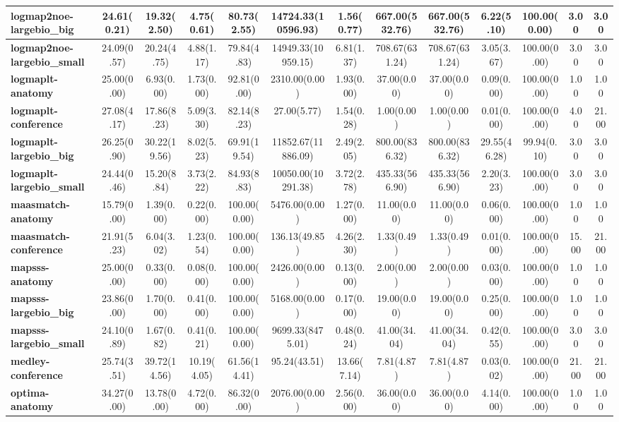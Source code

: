 \begin{tabular}{|l|c|c|c|c|c|c|c|c|c|c|c|c|}
\textbf{logmap2noe-largebio\_big}&24.61(0.21)&19.32(2.50)&4.75(0.61)&80.73(2.55)&14724.33(10596.93)&1.56(0.77)&667.00(532.76)&667.00(532.76)&6.22(5.10)&100.00(0.00)&3.00&3.00\\\hline
\textbf{logmap2noe-largebio\_small}&24.09(0.57)&20.24(4.75)&4.88(1.17)&79.84(4.83)&14949.33(10959.15)&6.81(1.37)&708.67(631.24)&708.67(631.24)&3.05(3.67)&100.00(0.00)&3.00&3.00\\\hline
\textbf{logmaplt-anatomy}&25.00(0.00)&6.93(0.00)&1.73(0.00)&92.81(0.00)&2310.00(0.00)&1.93(0.00)&37.00(0.00)&37.00(0.00)&0.09(0.00)&100.00(0.00)&1.00&1.00\\\hline
\textbf{logmaplt-conference}&27.08(4.17)&17.86(8.23)&5.09(3.30)&82.14(8.23)&27.00(5.77)&1.54(0.28)&1.00(0.00)&1.00(0.00)&0.01(0.00)&100.00(0.00)&4.00&21.00\\\hline
\textbf{logmaplt-largebio\_big}&26.25(0.90)&30.22(19.56)&8.02(5.23)&69.91(19.54)&11852.67(11886.09)&2.49(2.05)&800.00(836.32)&800.00(836.32)&29.55(46.28)&99.94(0.10)&3.00&3.00\\\hline
\textbf{logmaplt-largebio\_small}&24.44(0.46)&15.20(8.84)&3.73(2.22)&84.93(8.83)&10050.00(10291.38)&3.72(2.78)&435.33(566.90)&435.33(566.90)&2.20(3.23)&100.00(0.00)&3.00&3.00\\\hline
\textbf{maasmatch-anatomy}&15.79(0.00)&1.39(0.00)&0.22(0.00)&100.00(0.00)&5476.00(0.00)&1.27(0.00)&11.00(0.00)&11.00(0.00)&0.06(0.00)&100.00(0.00)&1.00&1.00\\\hline
\textbf{maasmatch-conference}&21.91(5.23)&6.04(3.02)&1.23(0.54)&100.00(0.00)&136.13(49.85)&4.26(2.30)&1.33(0.49)&1.33(0.49)&0.01(0.00)&100.00(0.00)&15.00&21.00\\\hline
\textbf{mapsss-anatomy}&25.00(0.00)&0.33(0.00)&0.08(0.00)&100.00(0.00)&2426.00(0.00)&0.13(0.00)&2.00(0.00)&2.00(0.00)&0.03(0.00)&100.00(0.00)&1.00&1.00\\\hline
\textbf{mapsss-largebio\_big}&23.86(0.00)&1.70(0.00)&0.41(0.00)&100.00(0.00)&5168.00(0.00)&0.17(0.00)&19.00(0.00)&19.00(0.00)&0.25(0.00)&100.00(0.00)&1.00&1.00\\\hline
\textbf{mapsss-largebio\_small}&24.10(0.89)&1.67(0.82)&0.41(0.21)&100.00(0.00)&9699.33(8475.01)&0.48(0.24)&41.00(34.04)&41.00(34.04)&0.42(0.55)&100.00(0.00)&3.00&3.00\\\hline
\textbf{medley-conference}&25.74(3.51)&39.72(14.56)&10.19(4.05)&61.56(14.41)&95.24(43.51)&13.66(7.14)&7.81(4.87)&7.81(4.87)&0.03(0.02)&100.00(0.00)&21.00&21.00\\\hline
\textbf{optima-anatomy}&34.27(0.00)&13.78(0.00)&4.72(0.00)&86.32(0.00)&2076.00(0.00)&2.56(0.00)&36.00(0.00)&36.00(0.00)&4.14(0.00)&100.00(0.00)&1.00&1.00\\\hline

\end{tabular}
